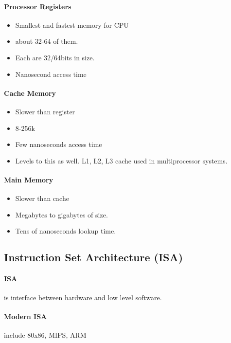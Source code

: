 \documentclass{article}
\newcommand\tab[1][0.5cm]{\hspace*{#1}}
\begin{document}
		\paragraph{\tab Processor Registers}
		\begin{itemize}
			\item Smallest and fastest memory for CPU
			\item about 32-64 of them.
			\item Each are 32/64bits in size.
			\item Nanosecond access time
		\end{itemize}

		\paragraph{\tab Cache Memory}
		\begin{itemize}
			\item Slower than register
			\item 8-256k
			\item Few nanoseconds access time
			\item Levels to this as well. L1, L2, L3 cache used in multiprocessor systems.
		\end{itemize}

		\paragraph{\tab Main Memory}
		\begin{itemize}
			\item Slower than cache
			\item Megabytes to gigabytes of size.
			\item Tens of nanoseconds lookup time.
		\end{itemize}

	\subsection{Instruction Set Architecture (ISA)}
		\paragraph{\tab ISA} is interface between hardware and low level software.
		\paragraph{\tab Modern ISA} include 80x86, MIPS, ARM
\end{document}
